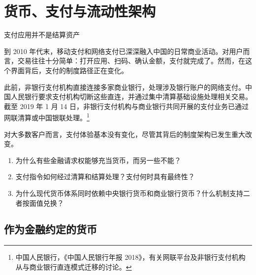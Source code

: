 \chapter{货币、支付与流动性架构}
\label{chap:Money_Payments_and_Liquidity_Architecture}

\begin{openingcase}{支付应用并不是结算资产}

到 2010 年代末，移动支付和网络支付已深深融入中国的日常商业活动。对用户而言，交易往往十分简单：打开应用、扫码、确认金额，支付就完成了。然而，在这个界面背后，支付的制度路径正在变化。

此前，非银行支付机构直接连接多家商业银行，处理涉及银行账户的网络支付。中国人民银行要求支付机构切断这些直连，并通过集中清算基础设施处理相关交易。截至 2019 年 1 月 14 日，非银行支付机构与商业银行共同开展的支付业务已通过网联清算或中国银联处理。\footnote{中国人民银行，《中国人民银行年报 2018》，有关网联平台及非银行支付机构从与商业银行直连模式迁移的讨论。}

对大多数客户而言，支付体验基本没有变化，尽管其背后的制度架构已发生重大改变。

\end{openingcase}


\begin{tcolorbox}[
  enhanced,
  colback=FinanceBlue!6,
  colframe=FinanceBlue,
  boxrule=0.6pt,
  sharp corners,
  left=8pt,
  right=8pt,
  top=7pt,
  bottom=7pt,
  before skip=1em,
  after skip=1.6em,
  title=\textbf{核心问题},
  coltitle=white,
  colbacktitle=FinanceBlue,
  fonttitle=\bfseries,
  attach boxed title to top left={xshift=6pt,yshift=-2mm},
  boxed title style={
    boxrule=0pt,
    sharp corners,
    left=5pt,
    right=5pt,
    top=2pt,
    bottom=2pt
  }
]
\begin{enumerate}[
  leftmargin=*,
  label=\textcolor{FinanceBlue}{\textbf{\arabic*.}},
  itemsep=0.55em,
  topsep=0.2em
]
\item 为什么有些金融请求权能够充当货币，而另一些不能？
\item 支付指令如何经过清算和结算处理？支付何时具有最终性？
\item 为什么现代货币体系同时依赖中央银行货币和商业银行货币？什么机制支持二者按面值兑换？
\end{enumerate}
\end{tcolorbox}

\section{作为金融约定的货币}


